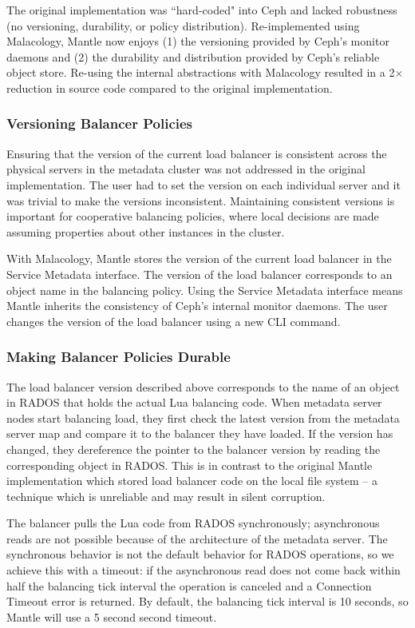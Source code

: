 The original implementation was ``hard-coded" into Ceph and lacked robustness
(no versioning, durability, or policy distribution).  Re-implemented using
Malacology, Mantle now enjoys (1) the versioning provided by Ceph's monitor
daemons and (2) the durability and distribution provided by Ceph's reliable
object store.  Re-using the internal abstractions with Malacology resulted in a
2\(\times\) reduction in source code compared to the original implementation.

\subsubsection{Versioning Balancer Policies}

Ensuring that the version of the current load balancer is consistent across the
physical servers in the metadata cluster was not addressed in the original
implementation. The user had to set the version on each individual server and
it was trivial to make the versions inconsistent. Maintaining consistent
versions is important for cooperative balancing policies, where local decisions
are made assuming properties about other instances in the cluster.

With Malacology, Mantle stores the version of the current load balancer in the
Service Metadata interface. The version of the load balancer corresponds to an
object name in the balancing policy. Using the Service Metadata interface means
Mantle inherits the consistency of Ceph's internal monitor daemons. The user
changes the version of the load balancer using a new CLI command.

\subsubsection{Making Balancer Policies Durable}

The load balancer version described above corresponds to the name of an object
in RADOS that holds the actual Lua balancing code.  When metadata server nodes
start balancing load, they first check the latest version from the metadata
server map and compare it to the balancer they have loaded. If the version has
changed, they dereference the pointer to the balancer version by reading the
corresponding object in RADOS. This is in contrast to the original Mantle
implementation which stored load balancer code on the local file system -- a
technique which is unreliable and may result in silent corruption.

The balancer pulls the Lua code from RADOS synchronously; asynchronous reads
are not possible because of the architecture of the metadata server. The
synchronous behavior is not the default behavior for RADOS operations, so we
achieve this with a timeout: if the asynchronous read does not come back within
half the balancing tick interval the operation is canceled and a Connection
Timeout error is returned. By default, the balancing tick interval is 10
seconds, so Mantle will use a 5 second second timeout.

